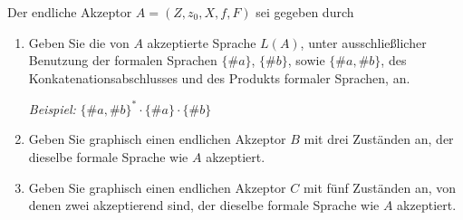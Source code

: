 \documentclass[12pt]{article}
\begin{document}


\begin{aufgabe}[1 + 1,5 + 1,5 = 4]
  Der endliche Akzeptor $A = (Z, z_0, X, f, F)$ sei gegeben durch %
  \begin{center}
  \end{center}
  \begin{enumerate}
    \item Geben Sie die von $A$ akzeptierte Sprache $L(A)$, unter ausschließlicher Benutzung der formalen Sprachen $\{\#a\}$, $\{\#b\}$, sowie $\{\#a, \#b\}$, des Konkatenationsabschlusses und des Produkts formaler Sprachen, an.

          \emph{Beispiel:} $\{\#a, \#b\}^* \cdot \{\#a\} \cdot \{\#b\}$
    \item Geben Sie graphisch einen endlichen Akzeptor $B$ mit drei Zuständen an, der dieselbe formale Sprache wie $A$ akzeptiert.
    \item Geben Sie graphisch einen endlichen Akzeptor $C$ mit fünf Zuständen an, von denen zwei akzeptierend sind, der dieselbe formale Sprache wie $A$ akzeptiert.
  \end{enumerate}
\end{aufgabe}
\end{document}
